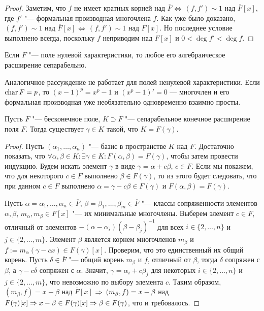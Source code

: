 \begin{proof}
	Заметим, что $f$ не имеет кратных корней над $\overline{F}$ $\Leftrightarrow$ $(f, f') \sim 1$ над $\overline{F}[x]$, где $f'$ "--- формальная производная многочлена $f$. Как уже было доказано, $(f, f') \sim 1$ над $\overline{F}[x]$ $\Leftrightarrow$ $(f, f') \sim 1$ над $F[x]$. Но последнее условие выполнено всегда, поскольку $f$ неприводим над $F[x]$ и $0 < \deg{f'} < \deg{f}$.
\end{proof}

\begin{corollary}
	 Если $F$ "--- поле нулевой характеристики, то любое его алгебраическое расширение сепарабельно.
\end{corollary}

\begin{note}
	Аналогичное рассуждение не работает для полей ненулевой характеристики. Если $\operatorname{char}{F} = p$, то $(x - 1)^p = x^p - 1$ и $(x^p - 1)' = 0$ --- многочлен и его формальная производная уже необязательно одновременно взаимно просты.
\end{note}

\begin{theorem}
	Пусть $F$ "--- бесконечное поле, $K \supset F$ "--- сепарабельное конечное расширение поля $F$. Тогда существует $\gamma \in K$ такой, что $K = F(\gamma)$.
\end{theorem}

\begin{proof}
	Пусть $(\alpha_1, \dotsc, \alpha_n)$ "--- базис в пространстве $K$ над $F$. Достаточно показать, что $\forall \alpha, \beta \in K: \exists \gamma \in K: F(\alpha, \beta) = F(\gamma)$, чтобы затем провести индукцию. Будем искать элемент $\gamma$ в виде $\gamma = \alpha +c\beta$, $c \in F$. Если мы покажем, что для некоторого $c \in F$ выполнено $\beta \in F(\gamma)$, то из этого будет следовать, что при данном $c \in F$ выполнено $\alpha = \gamma - c\beta \in F(\gamma)$ и $F(\alpha, \beta) = F(\gamma)$.
	
	Пусть $\alpha = \alpha_1, \dotsc, \alpha_n \in \overline{F}$, $\beta = \beta_1, \dotsc, \beta_m \in \overline{F}$ "--- классы сопряженности элементов $\alpha, \beta$, $m_\alpha, m_\beta \in F[x]$ "--- их минимальные многочлены. Выберем элемент $c \in F$, отличный от элементов $-(\alpha - \alpha_i)(\beta - \beta_j)^{-1}$ для всех $i \in \{2, \dotsc, n\}$ и $j \in \{2, \dotsc, m\}$. Элемент $\beta$ является корнем многочленов $m_\beta$ и $f := m_\alpha(\gamma - cx) \in F(\gamma)[x]$. Проверим, что это единственный их общий корень. Пусть $\delta \in \overline{F}$ "--- общий корень $m_\beta$ и $f$, отличный от $\beta$, тогда $\delta$ сопряжен с $\beta$, а $\gamma - c\delta$ сопряжен с $\alpha$. Значит, $\gamma = \alpha_i + c\beta_j$ для некоторых $i \in \{2, \dotsc, n\}$ и $j \in \{2, \dotsc, m\}$, что невозможно по выбору элемента $c$. Таким образом, $(m_\beta, f) = x - \beta$ над $\overline{F}[x]$ $\Rightarrow$ $(m_\beta, f) \hm= x - \beta$ над $F(\gamma)[x] \Rightarrow x - \beta \in F(\gamma)[x] \Rightarrow \beta \in F(\gamma)$, что и требовалось.
\end{proof}

